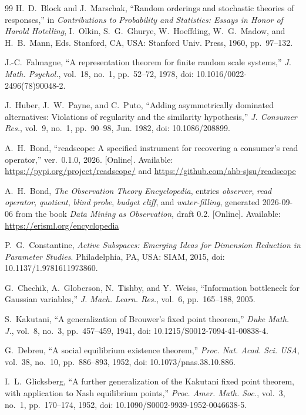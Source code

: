 \documentclass[11pt]{article}
\theoremstyle{definition}
\theoremstyle{remark}
\begin{document}
\begin{thebibliography}{99}
H.~D.~Block and J.~Marschak, ``Random orderings and stochastic theories of responses,'' in \emph{Contributions to Probability and Statistics: Essays in Honor of Harold Hotelling}, I.~Olkin, S.~G.~Ghurye, W.~Hoeffding, W.~G.~Madow, and H.~B.~Mann, Eds. Stanford, CA, USA: Stanford Univ. Press, 1960, pp.~97--132.

J.-C.~Falmagne, ``A representation theorem for finite random scale systems,'' \emph{J. Math. Psychol.}, vol.~18, no.~1, pp.~52--72, 1978, doi: 10.1016/0022-2496(78)90048-2.

J.~Huber, J.~W.~Payne, and C.~Puto, ``Adding asymmetrically dominated alternatives: Violations of regularity and the similarity hypothesis,'' \emph{J. Consumer Res.}, vol.~9, no.~1, pp.~90--98, Jun. 1982, doi: 10.1086/208899.

A.~H.~Bond, ``readscope: A specified instrument for recovering a consumer's read operator,'' ver.~0.1.0, 2026. [Online]. Available: \url{https://pypi.org/project/readscope/} and \url{https://github.com/ahb-sjsu/readscope}

A.~H.~Bond, \emph{The Observation Theory Encyclopedia}, entries \emph{observer}, \emph{read operator}, \emph{quotient}, \emph{blind probe}, \emph{budget cliff}, and \emph{water-filling}, generated 2026-09-06 from the book \emph{Data Mining as Observation}, draft 0.2. [Online]. Available: \url{https://erisml.org/encyclopedia}

P.~G.~Constantine, \emph{Active Subspaces: Emerging Ideas for Dimension Reduction in Parameter Studies}. Philadelphia, PA, USA: SIAM, 2015, doi: 10.1137/1.9781611973860.

G.~Chechik, A.~Globerson, N.~Tishby, and Y.~Weiss, ``Information bottleneck for Gaussian variables,'' \emph{J. Mach. Learn. Res.}, vol.~6, pp.~165--188, 2005.

S.~Kakutani, ``A generalization of Brouwer's fixed point theorem,'' \emph{Duke Math. J.}, vol.~8, no.~3, pp.~457--459, 1941, doi: 10.1215/S0012-7094-41-00838-4.

G.~Debreu, ``A social equilibrium existence theorem,'' \emph{Proc. Nat. Acad. Sci. USA}, vol.~38, no.~10, pp.~886--893, 1952, doi: 10.1073/pnas.38.10.886.

I.~L.~Glicksberg, ``A further generalization of the Kakutani fixed point theorem, with application to Nash equilibrium points,'' \emph{Proc. Amer. Math. Soc.}, vol.~3, no.~1, pp.~170--174, 1952, doi: 10.1090/S0002-9939-1952-0046638-5.


\end{thebibliography}
\end{document}
